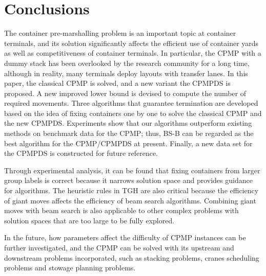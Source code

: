 \documentclass[review,3p,times,authoryear,12pt]{elsarticle}
\begin{document}
\section{Conclusions}
\label{sec:con}

The container pre-marshalling problem is an important topic at container terminals, and its solution significantly affects the efficient use of container yards as well as competitiveness of container terminals.
In particular, the CPMP with a dummy stack has been overlooked by the research community for a long time, although in reality, many terminals deploy layouts with transfer lanes.
In this paper, the classical CPMP is solved, and a new variant the CPMPDS is proposed.
A new improved lower bound is devised to compute the number of required movements.
Three algorithms that guarantee termination are developed based on the idea of fixing containers one by one to solve the classical CPMP and the new CPMPDS.
Experiments show that our algorithms outperform existing methods on benchmark data for the CPMP; thus, BS-B can be regarded as the best algorithm for the CPMP/CPMPDS at present.
Finally, a new data set for the CPMPDS is constructed for future reference.

Through experimental analysis, it can be found that fixing containers from larger group labels is correct because it narrows solution space and provides guidance for algorithms.
The heuristic rules in TGH are also critical because the efficiency of giant moves affects the efficiency of beam search algorithms.
Combining giant moves with beam search is also applicable to other complex problems with solution spaces that are too large to be fully explored.

In the future, how parameters affect the difficulty of CPMP instances can be further investigated, and the CPMP can be solved with its upstream and downstream problems incorporated, such as stacking problems, cranes scheduling problems and stowage planning problems.






\end{document}
